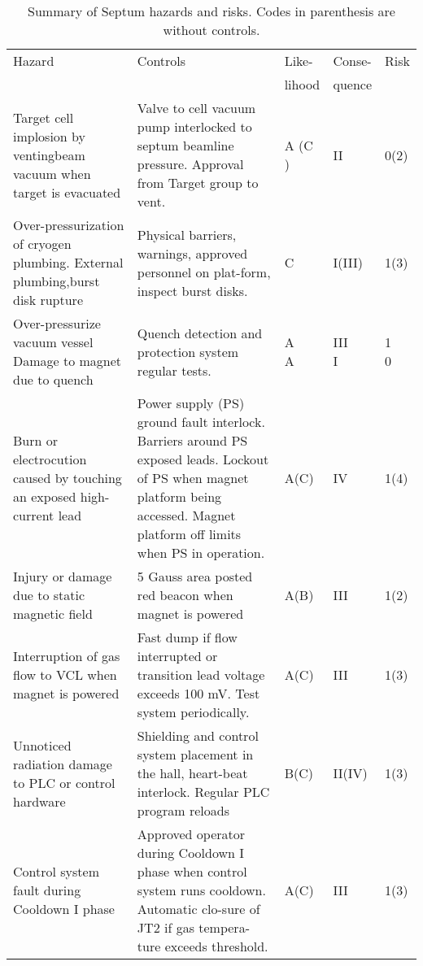\begin{table}[htp]
\begin{tabular}{|p{120pt}|p{170pt}|l|l|l|}
\hline
Hazard                    & Controls                              & Like-  & Conse- & Risk \\
                          &                                       & lihood & quence &      \\ \hline

Target cell implosion by ventingbeam vacuum when target is evacuated
& Valve to cell vacuum pump interlocked to septum beamline pressure. Approval from Target group to vent.
& A (C ) & II     & 0(2) \\ \hline

Over-pressurization of cryogen plumbing. External plumbing,burst disk rupture 
& Physical barriers, warnings, approved personnel on plat-form, inspect burst disks.
& C      &I(III)  & 1(3) \\ \hline

Over-pressurize vacuum vessel Damage to magnet due to quench
& Quench detection and protection system regular tests.
& \parbox{20pt}{A \\ A} & \parbox{20pt}{III \\ I} & \parbox{20pt}{1 \\ 0} \\ \hline

Burn or electrocution caused by touching an exposed high-current lead 
& Power supply (PS) ground fault interlock.  Barriers around PS exposed leads. 
  Lockout of PS when magnet platform being accessed. Magnet platform off limits 
  when PS in operation.	                          
& A(C)& IV  & 1(4) \\ \hline

Injury or damage due to static magnetic field     
& 5 Gauss area posted red beacon when magnet is powered     
& A(B) & III	  & 1(2)\\ \hline

Interruption of gas flow to VCL when magnet is powered
& Fast dump if flow interrupted or transition lead voltage exceeds 100 mV. Test system periodically.      
& A(C) & III	  & 1(3)\\ \hline

Unnoticed radiation damage to PLC or control hardware
& Shielding and control system placement in the hall, heart-beat interlock. Regular PLC program reloads
& B(C) & II(IV)& 1(3)\\ \hline

Control system fault during Cooldown I phase   
& Approved operator during Cooldown I phase when control system runs cooldown. 
  Automatic clo-sure of JT2 if gas tempera-ture exceeds threshold.  
& A(C) & III   & 1(3)\\ \hline
\end{tabular}
\caption[Septum: risk]{Summary of Septum hazards and risks.  Codes in parenthesis are without controls.}
\label{tab:septumrisk}
\end{table}


